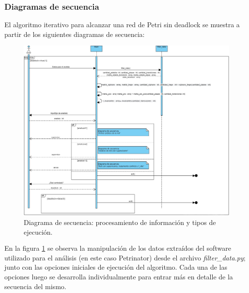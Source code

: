 \newpage
\subsubsection{Diagramas de secuencia}
El algoritmo iterativo para alcanzar una red de Petri sin deadlock se muestra a partir de los siguientes diagramas de secuencia: \\
\bigskip

\begin{figure}[H]
	\centering
	\includegraphics[width=\textwidth]{Figures/diagramasecuencia/Diagrama0.jpeg}
	\caption{Diagrama de secuencia: procesamiento de información y tipos de ejecución.}
	\label{fig:diagrama-sec}
\end{figure}
\bigskip

En la figura \ref{fig:diagrama-sec} se observa la manipulación de los datos extraídos del software utilizado para el análisis (en este caso Petrinator) desde el archivo \textit{filter\_data.py}; junto con las opciones iniciales de ejecución del algoritmo. Cada una de las opciones luego se desarrolla individualmente para entrar más en detalle de la secuencia del mismo.

